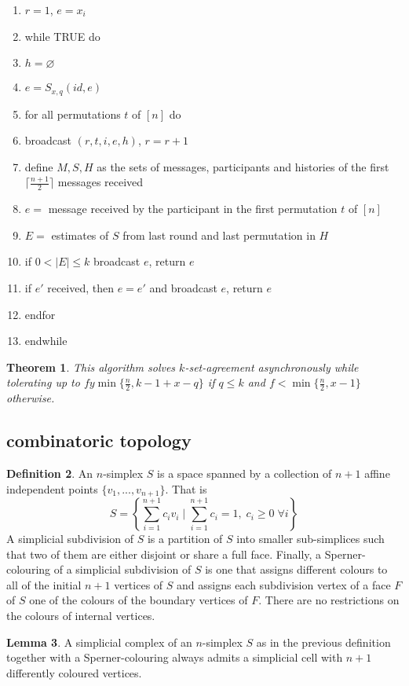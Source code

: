 \documentclass[a4paper, 12pt]{article}
\theoremstyle{plain}
\newtheorem{theorem}{Theorem}[section] %
\theoremstyle{definition}
\newtheorem{definition}[theorem]{Definition} %
\theoremstyle{lemma}
\newtheorem{lemma}[theorem]{Lemma}
\theoremstyle{remark}
\theoremstyle{corollary}
\theoremstyle{example}
\begin{document}
	\begin{enumerate}
		\item $r=1$, $e=x_i$
		\item while TRUE do
		\item $h=\varnothing$
		\item $e=S_{x,q}(id,e)$
		\item for all permutations $t$ of $[n]$ do
		\item broadcast $(r,t,i,e,h)$, $r=r+1$
		\item define $M,S,H$ as the sets of messages, participants and histories of the first $\lceil\frac{n+1}{2}\rceil$ messages received
		\item $e=$ message received by the participant in the first permutation $t$ of $[n]$
		\item $E=$ estimates of $S$ from last round and last permutation in $H$
		\item if $0<\left|E\right| \leq k$ broadcast $e$, return $e$
		\item if $e'$ received, then $e=e'$ and broadcast $e$, return $e$
		\item endfor
		\item endwhile
	\end{enumerate}
	\begin{theorem}
		This algorithm solves $k$-set-agreement asynchronously while tolerating up to $fy\min\{\frac{n}{2},k-1+x-q\}$ if $q\leq k$ and $f<\min\{\frac{n}{2}, x-1\}$ otherwise.
	\end{theorem}
	\subsection{combinatoric topology}
	\begin{definition}
		An $n$-simplex $S$ is a space spanned by a collection of $n+1$ affine independent points $\{v_1,...,v_{n+1}\}$. That is \[S = \left\{\sum_{i=1}^{n+1} c_i v_i \mid \sum_{i=1}^{n+1} c_i = 1, \; c_i \geq 0 \; \forall i\right\}\]
		A simplicial subdivision of $S$ is a partition of $S$ into smaller sub-simplices such that two of them are either disjoint or share a full face. Finally, a Sperner-colouring of a simplicial subdivision of $S$ is one that assigns different colours to all of the initial $n+1$ vertices of $S$ and assigns each subdivision vertex of a face $F$ of $S$ one of the colours of the boundary vertices of $F$. There are no restrictions on the colours of internal vertices.
	\end{definition}
	\begin{lemma}
		A simplicial complex of an $n$-simplex $S$ as in the previous definition together with a Sperner-colouring always admits a simplicial cell with $n+1$ differently coloured vertices.
	\end{lemma}
\end{document}
